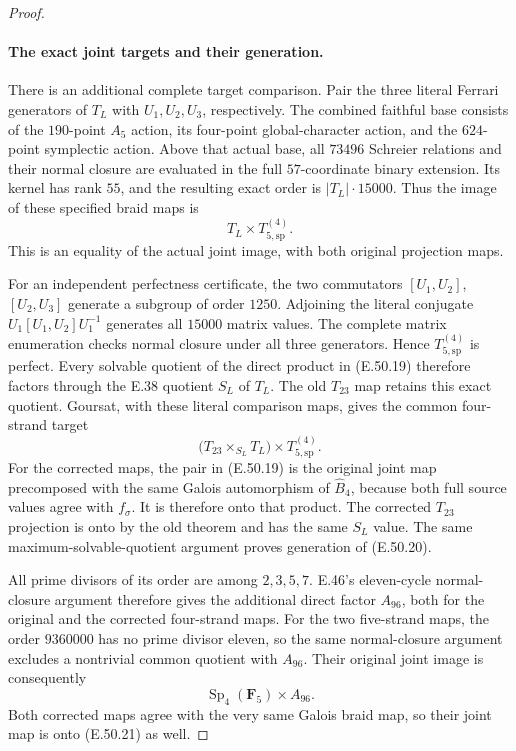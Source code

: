 \begin{proof}
\paragraph{The exact joint targets and their generation.}
There is an additional complete target comparison.
Pair the three literal Ferrari generators of $T_L$
with $U_1,U_2,U_3$, respectively.  The combined
faithful base consists of the $190$-point $A_5$
action, its four-point global-character action,
and the $624$-point symplectic action.
Above that actual base, all $73496$ Schreier
relations and their normal closure are evaluated
in the full $57$-coordinate binary extension.
Its kernel has rank $55$, and the resulting
exact order is $|T_L|\cdot15000$.
Thus the image of these specified braid maps is
\[
                    T_L\times T_{5,\mathrm{sp}}^{(4)}.
 \tag{E.50.19}
\]
This is an equality of the actual joint image,
with both original projection maps.

For an independent perfectness certificate,
the two commutators $[U_1,U_2]$, $[U_2,U_3]$
generate a subgroup of order $1250$.
Adjoining the literal conjugate
$U_1[U_1,U_2]U_1^{-1}$ generates all $15000$
matrix values.  The complete matrix enumeration
checks normal closure under all three generators.
Hence $T_{5,\mathrm{sp}}^{(4)}$ is perfect.
Every solvable quotient of the direct product
in \textup{(E.50.19)} therefore factors through
the E.38 quotient $S_L$ of $T_L$.
The old $T_{23}$ map retains this exact quotient.
Goursat, with these literal comparison maps,
gives the common four-strand target
\[
       \bigl(T_{23}\times_{S_L}T_L\bigr)
                         \times T_{5,\mathrm{sp}}^{(4)}.
 \tag{E.50.20}
\]
For the corrected maps, the pair in
\textup{(E.50.19)} is the original joint map
precomposed with the same Galois automorphism
of $\widehat B_4$, because both full source
values agree with $f_\sigma$.
It is therefore onto that product.
The corrected $T_{23}$ projection is onto by
the old theorem and has the same $S_L$ value.
The same maximum-solvable-quotient argument
proves generation of \textup{(E.50.20)}.

All prime divisors of its order are among
$2,3,5,7$.  E.46's eleven-cycle normal-closure
argument therefore gives the additional direct
factor $A_{96}$, both for the original and
the corrected four-strand maps.
For the two five-strand maps, the order
$9360000$ has no prime divisor eleven,
so the same normal-closure argument excludes
a nontrivial common quotient with $A_{96}$.
Their original joint image is consequently
\[
                \operatorname{Sp}_4(\mathbf F_5)\times A_{96}.
 \tag{E.50.21}
\]
Both corrected maps agree with the very same
Galois braid map, so their joint map is onto
\textup{(E.50.21)} as well.


\end{proof}

